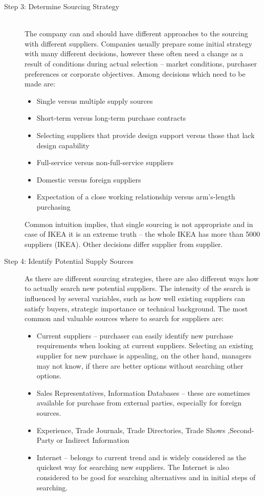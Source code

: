 \documentclass[oneside,12pt]{article}%
\begin{document}
\begin{description}
  \item[Step 3: Determine Sourcing Strategy] \hfill \\
  The company can and should have different approaches to the sourcing with different suppliers. Companies usually prepare some initial strategy with many different decisions, however these often need a change as a result of conditions during actual selection – market conditions, purchaser preferences or corporate objectives. Among decisions which need to be made are:
  \begin{itemize}
  \item Single versus multiple supply sources
  \item Short-term versus long-term purchase contracts
  \item Selecting suppliers that provide design support versus those that lack design capability
  \item Full-service versus non-full-service suppliers
  \item Domestic versus foreign suppliers
  \item Expectation of a close working relationship versus arm’s-length purchasing
  \end{itemize}
  Common intuition implies, that single sourcing is not appropriate and in case of IKEA it is an extreme truth – the whole IKEA has more than 5000 suppliers (IKEA). Other decisions differ supplier from supplier.


  \item[Step 4: Identify Potential Supply Sources]
  As there are different sourcing strategies, there are also different ways how to actually search new potential suppliers. The intensity of the search is influenced by several variables, such as how well existing suppliers can satisfy buyers, strategic importance or technical background. The most common and valuable sources where to search for suppliers are:
  \begin{itemize}
    \item Current suppliers – purchaser can easily identify new purchase requirements when looking at current suppliers. Selecting an existing supplier for new purchase is appealing, on the other hand, managers may not know, if there are better options without searching other options.
    \item Sales Representatives, Information Databases – these are sometimes available for purchase from external parties, especially for foreign sources.
    \item Experience, Trade Journals, Trade Directories, Trade Shows ,Second-Party or Indirect Information
    \item Internet – belongs to current trend and is widely considered as the quickest way for searching new suppliers. The Internet is also considered to be good for searching alternatives and in initial steps of searching.


\end{itemize}
\end{description}
\end{document}
